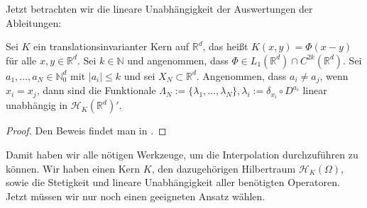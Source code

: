 Jetzt betrachten wir die lineare Unabhängigkeit der Auswertungen der Ableitungen:

\begin{theorem}
\label{linUn}
Sei $K$ ein translationsinvarianter Kern auf $\mathbb{R}^d$, das heißt $K(x,y) = \Phi (x-y)$ für alle $x,y \in \mathbb{R}^d$. Sei $k \in \mathbb{N}$ und angenommen, dass $\Phi \in L_1(\mathbb{R}^d) \cap C^{2k}(\mathbb{R}^d)$. Sei $a_1, \dots, a_N \in \mathbb{N}_0^d$ mit $|a_i| \le k$ und sei $X_N \subset \mathbb{R}^d$. Angenommen, dass $a_i \neq a_j$, wenn $x_i = x_j$, dann sind die Funktionale $\Lambda_N := \{\lambda_1, \dots, \lambda_N\}, \lambda_i := \delta_{x_i} \circ D^{a_i}$ linear unabhängig in $\mathcal{H}_K(\mathbb{R}^d)'$.
\end{theorem}

\begin{proof}
Den Beweis findet man in \textcite[Theorem 7.15]{Santin.2017}.
\end{proof}


Damit haben wir alle nötigen Werkzeuge, um die Interpolation durchzuführen zu können. Wir haben einen Kern $K$, den dazugehörigen Hilbertraum $\mathcal{H}_K(\Omega)$, sowie die Stetigkeit und lineare Unabhängigkeit aller benötigten Operatoren. Jetzt müssen wir nur noch einen geeigneten Ansatz wählen.